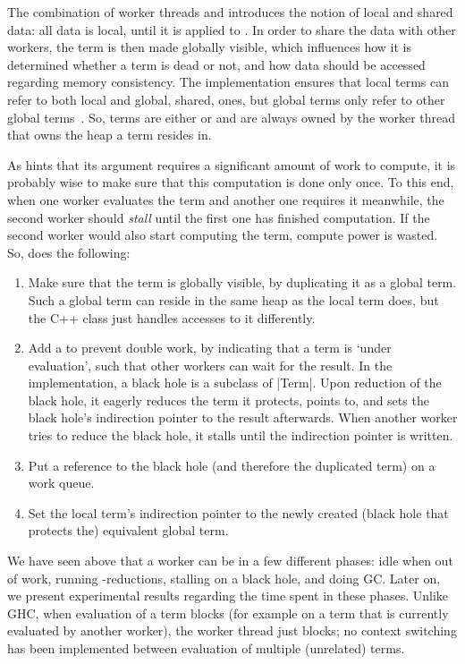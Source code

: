 The combination of worker threads and  introduces the notion of local and shared data: all data is local, until it is applied to .
In order to share the data with other workers, the term is then made globally visible, which influences how it is determined whether a term is dead or not, and how data should be accessed regarding memory consistency.
The implementation ensures that local terms can refer to both local and global, \ie shared, ones, but global terms only refer to other global terms~\cite{anderson:private_nursery_gc}.
So, terms are either  or  and are always owned by the worker thread that owns the heap a term resides in.

As  hints that its argument requires a significant amount of work to compute, it is probably wise to make sure that this computation is done only once. %
To this end, when one worker evaluates the term and another one requires it meanwhile, the second worker should \emph{stall} until the first one has finished computation.
If the second worker would also start computing the term, compute power is wasted.
So,  does the following:
\begin{enumerate}
\item Make sure that the term is globally visible, by duplicating it as a global term.
	Such a global term can reside in the same heap as the local term does, but the C++ class just handles accesses to it differently.
\item Add a \emph{} to prevent double work, by indicating that a term is `under evaluation', such that other workers can wait for the result.
	In the implementation, a black hole is a subclass of \lsticode|Term|.
	Upon reduction of the black hole, it eagerly reduces the term it protects, \ie points to, and sets the black hole's indirection pointer to the result afterwards.
	When another worker tries to reduce the black hole, it stalls until the indirection pointer is written.
\item Put a reference to the black hole (and therefore the duplicated term) on a work queue.
\item Set the local term's indirection pointer to the newly created (black hole that protects the) equivalent global term.
\end{enumerate}

We have seen above that a worker can be in a few different phases: idle when out of work, running \fxbeta-reductions, stalling on a black hole, and doing \acl{GC}.
Later on, we present experimental results regarding the time spent in these phases.
Unlike \ac{GHC}, when evaluation of a term blocks (for example on a term that is currently evaluated by another worker), the worker thread just blocks; no context switching has been implemented between evaluation of multiple (unrelated) terms.

